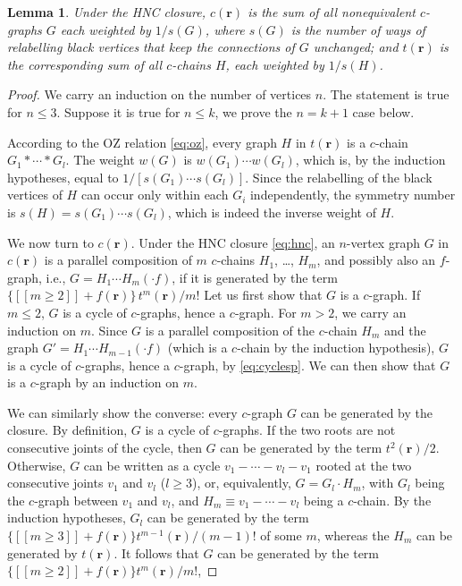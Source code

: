 \documentclass[notitlepage,preprint]{revtex4-1}
\newtheorem{lemm}[thrm]{Lemma}
\newcommand{\vct}[1]{\mathbf{#1}}
\providecommand{\vr}{} %
\renewcommand{\vr}{\vct{r}}
\newcommand{\llbra}{[\![}
\newcommand{\llket}{]\!]}
\begin{document}
\begin{lemm}
Under the HNC closure,
%
$c(\vr)$
  is the sum of all nonequivalent $c$-graphs $G$
  each weighted by $1/s(G)$,
  where $s(G)$ is the number of ways of relabelling
  \emph{black} vertices that keep the connections of $G$ unchanged;
%
and $t(\vr)$ is the corresponding sum of all
  $c$-chains $H$, each weighted by $1/s(H)$.
\end{lemm}
%
%
%
\begin{proof}
%
We carry an induction on the number of vertices $n$.
%
The statement is true for $n \le 3$.
%
Suppose it is true for $n \le k$,
  we prove the $n = k + 1$ case below.

According to the OZ relation \eqref{eq:oz},
  every graph $H$ in $t(\vr)$ is
  a $c$-chain $G_1 * \cdots * G_l$.
%
The weight $w(G)$ is
  $w(G_1) \cdots w(G_l)$,
  which is, by the induction hypotheses, equal to
  $1/\left[ s(G_1) \cdots s(G_l) \right]$.
%
Since the relabelling of the black vertices of $H$
  can occur only within each $G_i$ independently,
  the symmetry number is
  $s(H) = s(G_1) \cdots s(G_l)$,
  which is indeed the inverse weight of $H$.

We now turn to $c(\vr)$.
%
Under the HNC closure \eqref{eq:hnc},
  an $n$-vertex graph $G$ in $c(\vr)$ is
  a parallel composition of
  $m$ $c$-chains $H_1$, \dots, $H_m$,
  and possibly also an $f$-graph,
  i.e., $G = H_1 \cdots H_m (\cdot f)$,
  if it is generated by the term
  $\big\{\llbra m \ge 2 \llket + f(\vr)\big\} \, t^m(\vr) / m!$
%
Let us first show that $G$ is a $c$-graph.
%
If $m \le 2$,
  $G$ is a cycle of $c$-graphs,
  hence a $c$-graph.
%
For $m > 2$, we carry an induction on $m$.
%
Since $G$ is a parallel composition of the $c$-chain $H_m$
  and the graph
  $G' = H_1 \cdots H_{m-1} (\cdot f)$ (which is a $c$-chain by the induction hypothesis),
  $G$ is a cycle of $c$-graphs, hence a $c$-graph,
  by \eqref{eq:cyclesp}.
%
We can then show that $G$ is a $c$-graph by an induction on $m$.



We can similarly show the converse:
  every $c$-graph $G$ can be generated by the closure.
%
By definition, $G$ is a cycle of $c$-graphs.
%
If the two roots are not consecutive joints of the cycle,
  then $G$ can be generated by the term $t^2(\vr)/2$.
%
Otherwise, $G$ can be written as a cycle
  $v_1 - \cdots - v_l - v_1$
  rooted at the two consecutive joints $v_1$ and $v_l$
  ($l \ge 3$),
%
or, equivalently, $G = G_l \cdot H_m$,
  with
    $G_l$ being the $c$-graph between $v_1$ and $v_l$,
  and
    $H_m \equiv v_1 - \cdots - v_l$
    being a $c$-chain.
%
By the induction hypotheses,
  $G_l$ can be generated by the term
  $\big\{ \llbra m \ge 3 \llket +f(\vr) \big\} t^{m - 1}(\vr) / (m - 1)!$
  of some $m$,
whereas
  the $H_m$ can be generated by $t(\vr)$.
%
It follows that
  $G$ can be generated by the term
  $\big\{ \llbra m \ge 2 \llket  + f(\vr)\big\} t^{m}(\vr) / m! $,
%




\end{proof}
\end{document}
